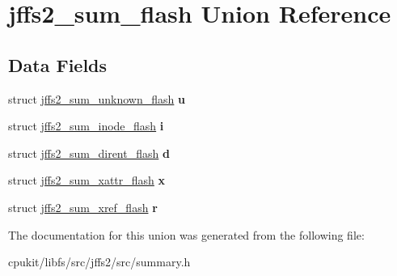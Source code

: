 \hypertarget{unionjffs2__sum__flash}{}\section{jffs2\+\_\+sum\+\_\+flash Union Reference}
\label{unionjffs2__sum__flash}
\subsection*{Data Fields}
\begin{DoxyCompactItemize}
\item 
\mbox{\label{unionjffs2__sum__flash_a2ee0f97ed52139b2cafb7293a8e1724e}} 
struct \mbox{\hyperlink{structjffs2__sum__unknown__flash}{jffs2\+\_\+sum\+\_\+unknown\+\_\+flash}} {\bfseries u}
\item 
\mbox{\label{unionjffs2__sum__flash_a58a126fc7d9b6e27f384cd8286dd3d40}} 
struct \mbox{\hyperlink{structjffs2__sum__inode__flash}{jffs2\+\_\+sum\+\_\+inode\+\_\+flash}} {\bfseries i}
\item 
\mbox{\label{unionjffs2__sum__flash_a016be36380e616cf0e3471552fa3a422}} 
struct \mbox{\hyperlink{structjffs2__sum__dirent__flash}{jffs2\+\_\+sum\+\_\+dirent\+\_\+flash}} {\bfseries d}
\item 
\mbox{\label{unionjffs2__sum__flash_a1c1f29917eb6183e3d13daa700c87d3b}} 
struct \mbox{\hyperlink{structjffs2__sum__xattr__flash}{jffs2\+\_\+sum\+\_\+xattr\+\_\+flash}} {\bfseries x}
\item 
\mbox{\label{unionjffs2__sum__flash_a4b0adfa2a850370c831175a84415b6f6}} 
struct \mbox{\hyperlink{structjffs2__sum__xref__flash}{jffs2\+\_\+sum\+\_\+xref\+\_\+flash}} {\bfseries r}
\end{DoxyCompactItemize}


The documentation for this union was generated from the following file\+:\begin{DoxyCompactItemize}
\item 
cpukit/libfs/src/jffs2/src/summary.\+h\end{DoxyCompactItemize}

